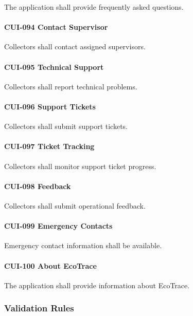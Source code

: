 The application shall provide frequently asked questions.

\paragraph{CUI-094 Contact Supervisor}

Collectors shall contact assigned supervisors.

\paragraph{CUI-095 Technical Support}

Collectors shall report technical problems.

\paragraph{CUI-096 Support Tickets}

Collectors shall submit support tickets.

\paragraph{CUI-097 Ticket Tracking}

Collectors shall monitor support ticket progress.

\paragraph{CUI-098 Feedback}

Collectors shall submit operational feedback.

\paragraph{CUI-099 Emergency Contacts}

Emergency contact information shall be available.

\paragraph{CUI-100 About EcoTrace}

The application shall provide information about EcoTrace.


\subsubsection*{Validation Rules}

